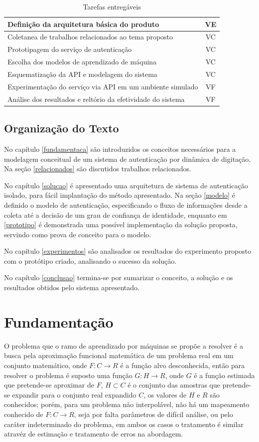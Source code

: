 \documentclass[pfc]{imetex}
\begin{document}
\begin{table}[htb]
\begin{tabular}{|l|c|}
\hline
Definição da arquitetura básica do produto & VE\\
\hline
Coletanea de trabalhos relacionados ao tema proposto & VC\\
\hline
Prototipagem do serviço de autenticação & VC\\
\hline
Escolha dos modelos de aprendizado de máquina & VC\\
\hline
Esquematização da API e modelagem do sistema & VC\\
\hline
Experimentação do serviço via API em um ambiente simulado & VF\\
\hline
Análise dos resultados e reltório da efetividade do sistema & VF\\
\hline
\end{tabular}

\caption{Tarefas entregáveis}
\end{table}


\section{Organização do Texto}
No capítulo \ref{fundamentaca} são introduzidos os conceitos necessários para a modelagem conceitual de um sistema de autenticação por dinâmica de digitação. Na seção \ref{relacionados} são discutidos trabalhos relacionados.

No capítulo \ref{solucao} é apresentado uma arquitetura de sistema de autenticação isolado, para fácil implantação do método apresentado. Na seção \ref{modelo} é definido o modelo de autenticação, especificando o fluxo de informações desde a coleta até a decisão de um grau de confiança de identidade, enquanto em \ref{prototipo} é demonstrada uma possível implementação da solução proposta, servindo como prova de conceito para o modelo.

No capítulo \ref{experimentos} são analisados os resultados do experimento proposto com o protótipo criado, analisando o sucesso da solução.

No capítulo \ref{conclusao} termina-se por sumarizar o conceito, a solução e os resultados obtidos pelo sistema apresentado.

\chapter{Fundamentação}
   O problema que o ramo de aprendizado por máquinas se propõe a resolver é a busca pela aproximação funcional matemática de um problema real em um conjunto matemático, onde $F:C \rightarrow R$ é a função alvo desconhecida, então para resolver o problema é suposto uma função $G:H \rightarrow R$, onde $G$ é a função estimada que pretende-se aproximar de $F$, $H \subset C$ é o conjunto das amostras que pretende-se expandir para o conjunto real expandido $C$, os valores de $H$ e $R$ são conhecidos; porém, para um problema não interpolável, não há um mapeamento conhecido de $F:C \rightarrow R$, seja por falta parâmetros de difícil análise, ou pelo caráter indeterminado do problema, em ambos os casos o tratamento é similar atravéz de estimação e tratamento de erros na abordagem.
\end{document}
